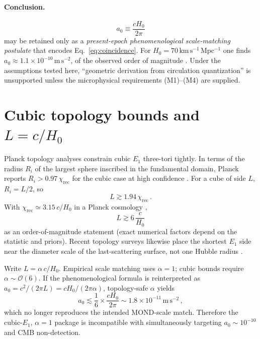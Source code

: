 \documentclass[aps,prd,reprint,superscriptaddress,nofootinbib,floatfix,showkeys]{revtex4-2}
\newcommand{\azero}{a_{0}}
\newcommand{\Hzero}{H_{0}}
\begin{document}
\paragraph{Conclusion.}
\begin{equation}
  \azero \equiv \frac{c\Hzero}{2\pi}
  \label{eq:a0-phen}
\end{equation}
may be retained only as a \emph{present-epoch phenomenological scale-matching
postulate} that encodes Eq.~\eqref{eq:coincidence}.  For
\(\Hzero=70\,\mathrm{km\,s^{-1}\,Mpc^{-1}}\) one finds
\(\azero\approx 1.1\times 10^{-10}\,\mathrm{m\,s^{-2}}\), of the observed
order of magnitude \cite{mcgaugh_rar}.  Under the assumptions tested here,
``geometric derivation from circulation quantization'' is unsupported unless
the microphysical requirements (M1)--(M4) are supplied.

\section{Cubic topology bounds and \texorpdfstring{\(L=c/\Hzero\)}{L = c/H0}}
\label{sec:bounds}

Planck topology analyses constrain cubic \(E_1\) three-tori tightly.  In terms
of the radius \(R_i\) of the largest sphere inscribed in the fundamental
domain, Planck reports \(R_i>0.97\,\chi_{\mathrm{rec}}\) for the cubic case at
high confidence \cite{planck_topology}.  For a cube of side \(L\),
\(R_i=L/2\), so
\begin{equation}
  L \gtrsim 1.94\,\chi_{\mathrm{rec}}\,.
  \label{eq:L-chi}
\end{equation}
With \(\chi_{\mathrm{rec}}\simeq 3.15\,c/\Hzero\) in a Planck cosmology
\cite{planck},
\begin{equation}
  L \gtrsim 6\,\frac{c}{\Hzero}
  \label{eq:L-H}
\end{equation}
as an order-of-magnitude statement (exact numerical factors depend on the
statistic and priors).  Recent topology surveys likewise place the shortest
\(E_1\) side near the diameter scale of the last-scattering surface, not one
Hubble radius \cite{compact_promise,planck_topology}.

Write \(L=\alpha\,c/\Hzero\).  Empirical scale matching uses \(\alpha=1\);
cubic bounds require \(\alpha\sim\mathcal{O}(6)\).  If the phenomenological
formula is reinterpreted as \(\azero=c^{2}/(2\pi L)=c\Hzero/(2\pi\alpha)\),
topology-safe \(\alpha\) yields
\begin{equation}
  \azero \lesssim \frac{1}{6}\times\frac{c\Hzero}{2\pi}
  \sim 1.8\times 10^{-11}\,\mathrm{m\,s^{-2}}\,,
  \label{eq:a0-suppressed}
\end{equation}
which no longer reproduces the intended MOND-scale match.  Therefore the
cubic-\(E_1\), \(\alpha=1\) package is incompatible with simultaneously
targeting \(\azero\sim 10^{-10}\) and CMB non-detection.
\end{document}
